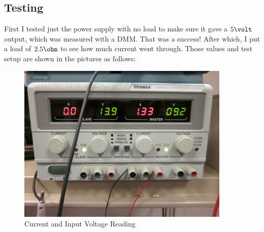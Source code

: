 \subsection{Testing}
First I tested just the power supply with no load to make sure it gave a $5\volt$ output, which was measured with a DMM. That was a success! After which, I put a load of $2.5\ohm$ to see how much current went through. Those values and test setup are shown in the pictures as follows:
\begin{figure}[htbp]
\begin{center}
\includegraphics[width=4in]{includes/IMG_0180}
\caption{Current and Input Voltage Reading}
\label{fig:1}
\end{center}
\end{figure}

